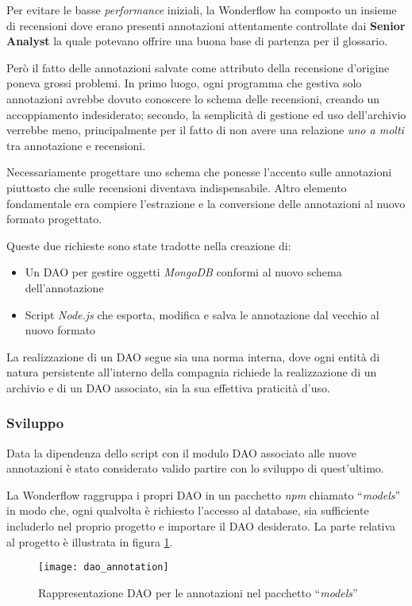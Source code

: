 Per evitare le basse \textit{performance} iniziali, la Wonderflow ha composto
un insieme di recensioni dove erano presenti annotazioni attentamente
controllate dai \textbf{Senior Analyst} la quale potevano offrire una buona base
di partenza per il glossario.

Però il fatto delle annotazioni salvate come attributo della recensione d'origine
poneva grossi problemi. In primo luogo, ogni programma che gestiva solo
annotazioni avrebbe dovuto conoscere lo schema delle recensioni, creando un
accoppiamento indesiderato; secondo, la semplicità di gestione ed uso
dell'archivio verrebbe meno, principalmente per il fatto di non avere una
relazione \textit{uno a molti} tra annotazione e recensioni.

Necessariamente progettare uno schema che ponesse l'accento sulle annotazioni
piuttosto che sulle recensioni diventava indispensabile. Altro elemento
fondamentale era compiere l'estrazione e la conversione delle annotazioni al
nuovo formato progettato.

Queste due richieste sono state tradotte nella creazione di:
\begin{itemize}
\item Un \gls{DAO} per gestire oggetti \textit{MongoDB} conformi al nuovo schema
dell'annotazione
\item Script \textit{Node.js} che esporta, modifica e salva le annotazione dal
vecchio al nuovo formato
\end{itemize}

La realizzazione di un \gls{DAO} segue sia una norma interna, dove ogni
entità di natura persistente all'interno della compagnia richiede la
realizzazione di un archivio e di un \gls{DAO} associato, sia la sua effettiva
praticità d'uso.

\subsubsection{Sviluppo}
Data la dipendenza dello script con il modulo \gls{DAO} associato alle nuove
annotazioni è stato considerato valido partire con lo sviluppo di quest'ultimo.

La Wonderflow raggruppa i propri \gls{DAO} in un pacchetto \textit{npm} chiamato
``\textit{models}'' in modo che, ogni qualvolta è richiesto l'accesso al
database, sia sufficiente includerlo nel proprio progetto e importare il
\gls{DAO} desiderato. La parte relativa al progetto è illustrata in figura
\ref{fig:dao_annotation}.

\begin{figure}[H]
\begin{center}
\texttt{[image: dao\_annotation]}
\caption{
Rappresentazione DAO per le annotazioni nel pacchetto ``\textit{models}''
}
\label{fig:dao_annotation}
\end{center}
\end{figure}

